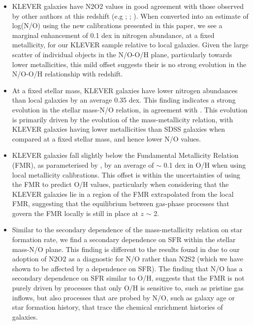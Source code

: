 \documentclass[usenatbib]{mnras} %
\begin{document}
\begin{itemize}
  \item KLEVER galaxies have N2O2 values in good agreement with those observed by other authors at this redshift (e.g \citealt{Shapley_2015}; \citealt{Steidel_2016}; \citealt{Strom_2017}). When converted into an estimate of log(N/O) using the new calibrations presented in this paper, we see a marginal enhancement of 0.1 dex in nitrogen abundance, at a fixed metallicity, for our KLEVER sample relative to local galaxies. Given the large scatter of individual objects in the N/O-O/H plane, particularly towards lower metallicities, this mild offset suggests their is no strong evolution in the N/O-O/H relationship with redshift.
  \item At a fixed stellar mass, KLEVER galaxies have lower nitrogen abundances than local galaxies by an average 0.35 dex. This finding indicates a strong evolution in the stellar mass-N/O relation, in agreement with \cite{Strom_2017}. This evolution is primarily driven by the evolution of the mass-metallicity relation, with KLEVER galaxies having lower metallicities than SDSS galaxies when compared at a fixed stellar mass, and hence lower N/O values.
  \item KLEVER galaxies fall slightly below the Fundamental Metallicity Relation (FMR), as parameterised by \cite{Curti_2020FMR}, by an average of $\sim$ 0.1 dex in O/H when using local metallicity calibrations. This offset is within the uncertainties of using the FMR to predict O/H values, particularly when considering that the KLEVER galaxies lie in a region of the FMR extrapolated from the local FMR, suggesting that the equilibrium between gas-phase processes that govern the FMR locally is still in place at $z$ $\sim$ 2.
  \item Similar to the secondary dependence of the mass-metallicity relation on star formation rate, we find a secondary dependence on SFR within the stellar mass-N/O plane. This finding is different to the results found in \cite{Perez-Montero_2013} due to our adoption of N2O2 as a diagnostic for N/O rather than N2S2 (which we have shown to be affected by a dependence on SFR). The finding that N/O has a secondary dependence on SFR similar to O/H, suggests that the FMR is not purely driven by processes that only O/H is sensitive to, such as pristine gas inflows, but also processes that are probed by N/O, such as galaxy age or star formation history, that trace the chemical enrichment histories of galaxies. 

\end{itemize}
\end{document}
